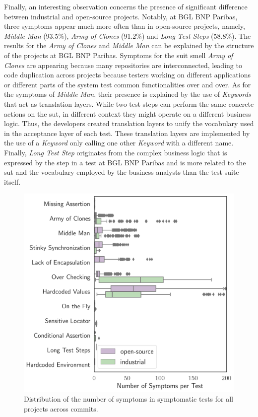 Finally, an interesting observation concerns the presence of significant difference between industrial and open-source projects. Notably, at BGL BNP Paribas, three symptoms appear much more often than in open-source projects, namely, \emph{Middle Man} (93.5\%), \emph{Army of Clones} (91.2\%) and \emph{Long Test Steps} (58.8\%). The results for the \emph{Army of Clones} and \emph{Middle Man} can be explained by the structure of the projects at BGL BNP Paribas. Symptoms for the \gls{suit} smell \emph{Army of Clones} are appearing because many repositories are interconnected, leading to code duplication across projects because testers working on different applications or different parts of the system test common functionalities over and over. As for the symptoms of \emph{Middle Man}, their presence is explained by the use of \emph{Keywords} that act as translation layers. While two test steps can perform the same concrete actions on the \gls{sut}, in different context they might operate on a different business logic. Thus, the developers created translation layers to unify the vocabulary used in the acceptance layer of each test. These translation layers are implemented by the use of a \emph{Keyword} only calling one other \emph{Keyword} with a different name. Finally, \emph{Long Test Step} originates from the complex business logic that is expressed by the step in a test at BGL BNP Paribas and is more related to the \gls{sut} and the vocabulary employed by the business analysts than the test suite itself.

\begin{figure}
\centering
\includegraphics[width=0.9\linewidth]{figures/smells/smell-raw-value-200-distribution-boxplot.png}
\caption{Distribution of the number of symptoms in symptomatic tests for all projects across commits.}  
\label{fig:raw-smells-distribution}
\end{figure}

